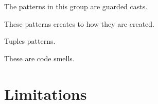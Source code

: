 
The patterns in this group are guarded casts.






These patterns creates to how they are created.








Tuples patterns.






These are code smells.














\section{Limitations}